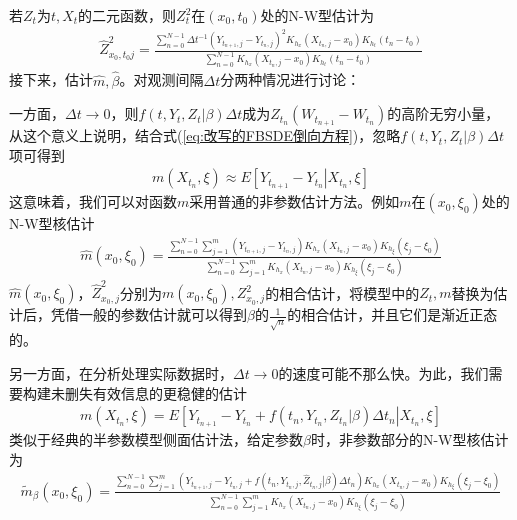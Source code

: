 		 若$Z_t$为$t,X_t$的二元函数，则$Z_t^2$在$(x_0,t_0)$处的N-W型估计为
		\begin{align*}
		\hat Z_{{x_0},{t_0}j}^2 = \frac{{\sum\limits_{n = 0}^{N - 1} {\Delta {t^{ - 1}}{{\left( {{Y_{{t_{n + 1}},j}} - {Y_{{t_n},j}}} \right)}^2}{K_{{h_x}}}\left( {{X_{{t_n},j}} - {x_0}} \right){K_{{h_t}}}\left( {{t_n} - {t_0}} \right)} }}{{\sum\limits_{n = 0}^{N - 1} {{K_{{h_x}}}\left( {{X_{{t_n},j}} - {x_0}} \right){K_{{h_t}}}\left( {{t_n} - {t_0}} \right)} }}\end{align*}
		接下来，估计$\hat{m},\hat{\beta}$。对观测间隔$\Delta t$分两种情况进行讨论：
		\par
		一方面，$\Delta t\rightarrow 0$，则$f(t,Y_t,Z_t|\beta)\Delta t$成为${Z_{{t_n}}( {{W_{{t_{n + 1}}}} - W_{t_n}} )}$的高阶无穷小量，从这个意义上说明，结合式(\ref{eq:改写的FBSDE倒向方程})，忽略$f(t,Y_t,Z_t|\beta)\Delta t$项可得到
		 \begin{align*}
		 m\left( {{X_{{t_n}}},\xi } \right) \approx E\left[ {{Y_{{t_{n + 1}}}} - {Y_{{t_n}}}\left| {{X_{{t_n}}},\xi } \right.} \right]
		 \end{align*}
		这意味着，我们可以对函数$m$采用普通的非参数估计方法。例如$m$在$(x_0,\xi_0)$处的N-W型核估计
		 \begin{align*}
		 \hat m(x_0,\xi _0) = \frac{\sum\limits_{n = 0}^{N - 1}\sum\limits_{j = 1}^m \left(Y_{t_{n + 1},j}-Y_{{t_n},j}\right)K_{h_x}\left(X_{{t_n},j} -x_0\right)K_{h_\xi}\left(\xi _j - \xi _0\right)} {\sum\limits_{n = 0}^{N-1} \sum\limits_{j = 1}^m K_{h_x}\left(X_{{t_n},j}-x_0\right)K_{h_\xi}\left(\xi _j-\xi _0 \right)}
		  \end{align*}
		 $\hat m\left( {{x_0},{\xi _0}} \right)$，$\hat Z_{{x_0},j}^2$分别为$m(x_0,\xi_0), Z_{{x_0},j}^2$的相合估计，将模型中的$Z_t,m$替换为估计后，凭借一般的参数估计就可以得到$\beta$的$\frac {1}{\sqrt{n}}$的相合估计，并且它们是渐近正态的。
		\par
		另一方面，在分析处理实际数据时，$\Delta t\rightarrow 0$的速度可能不那么快。为此，我们需要构建未删失有效信息的更稳健的估计
		\begin{align*}
		m\left(X_{t_n},\xi\right) = E\left[Y_{t_{n + 1}} - Y_{t_n} + f\left(t_n,Y_{t_n},Z_{t_n}\left| \beta \right.\right)\Delta {t_n}\left|X_{t_n},\xi\right.\right]
		\end{align*}
		类似于经典的半参数模型侧面估计法，给定参数$\beta$时，非参数部分的N-W型核估计为
		\begin{align*}
		{{\tilde m}_\beta }(x_0,\xi _0) = \frac{{\sum\limits_{n = 0}^{N - 1} {\sum\limits_{j = 1}^m {\left( {{Y_{{t_{n + 1}},j}} - {Y_{{t_n},j}} + f\left( {{t_n},{Y_{{t_n},j}},{{\hat Z}_{{t_n},j}}\left| \beta  \right.} \right)\Delta {t_n}} \right)} {K_{{h_x}}}\left( {{X_{{t_n},j}} - {x_0}} \right){K_{{h_\xi }}}\left( {{\xi _j} - {\xi _0}} \right)} }}{{\sum\limits_{n = 0}^{N - 1} {\sum\limits_{j = 1}^m {{K_{{h_x}}}\left( {{X_{{t_n},j}} - {x_0}} \right){K_{{h_\xi }}}\left( {{\xi _j} - {\xi _0}} \right)} } }}
		\end{align*}
